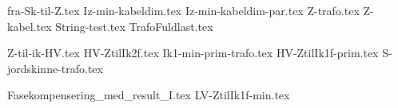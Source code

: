 \usepackage[utf8]{inputenc}%
\usepackage{amsmath}%
\usepackage{mathtools}%
\usepackage{icomma}%
\usepackage{siunitx}%
\usepackage{fp}%
\usepackage{xstring}%
\usepackage{listofitems}
\usepackage{ifthen}


{fra-Sk-til-Z.tex}
{Iz-min-kabeldim.tex}
{Iz-min-kabeldim-par.tex}
{Z-trafo.tex}
{Z-kabel.tex}
{String-test.tex}
{TrafoFuldlast.tex}

{Z-til-ik-HV.tex}
{HV-ZtilIk2f.tex}
{Ik1-min-prim-trafo.tex}
{HV-ZtilIk1f-prim.tex}
{S-jordskinne-trafo.tex}


{Fasekompensering_med_result_I.tex}
{LV-ZtilIk1f-min.tex}